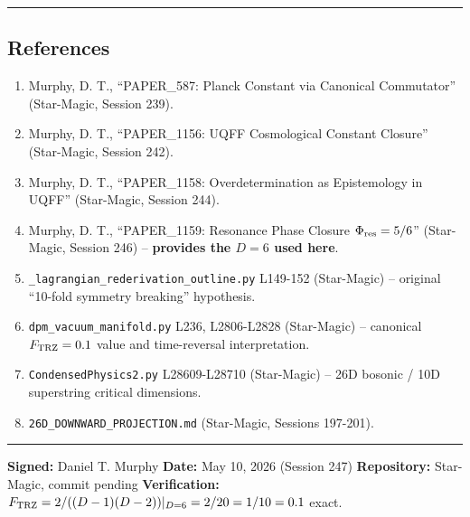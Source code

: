 \documentclass[
]{article}
\providecommand{\tightlist}{%
  \setlength{\itemsep}{0pt}\setlength{\parskip}{0pt}}
\begin{document}
\begin{center}\rule{0.5\linewidth}{0.5pt}\end{center}

\subsection{References}\label{references}

\begin{enumerate}
\def\labelenumi{\arabic{enumi}.}
\tightlist
\item
  Murphy, D. T., ``PAPER\_587: Planck Constant via Canonical
  Commutator'' (Star-Magic, Session 239).
\item
  Murphy, D. T., ``PAPER\_1156: UQFF Cosmological Constant Closure''
  (Star-Magic, Session 242).
\item
  Murphy, D. T., ``PAPER\_1158: Overdetermination as Epistemology in
  UQFF'' (Star-Magic, Session 244).
\item
  Murphy, D. T., ``PAPER\_1159: Resonance Phase Closure
  \(\Phi_{\rm res} = 5/6\)'' (Star-Magic, Session 246) --
  \textbf{provides the \(D=6\) used here}.
\item
  \texttt{\_lagrangian\_rederivation\_outline.py} L149-152 (Star-Magic)
  -- original ``10-fold symmetry breaking'' hypothesis.
\item
  \texttt{dpm\_vacuum\_manifold.py} L236, L2806-L2828 (Star-Magic) --
  canonical \(F_{\rm TRZ} = 0.1\) value and time-reversal
  interpretation.
\item
  \texttt{CondensedPhysics2.py} L28609-L28710 (Star-Magic) -- 26D
  bosonic / 10D superstring critical dimensions.
\item
  \texttt{26D\_DOWNWARD\_PROJECTION.md} (Star-Magic, Sessions 197-201).
\end{enumerate}

\begin{center}\rule{0.5\linewidth}{0.5pt}\end{center}

\textbf{Signed:} Daniel T. Murphy \textbf{Date:} May 10, 2026 (Session
247) \textbf{Repository:} Star-Magic, commit pending
\textbf{Verification:}
\(F_{\rm TRZ} = 2/((D-1)(D-2))|_{D=6} = 2/20 = 1/10 = 0.1\) exact.




\end{document}
